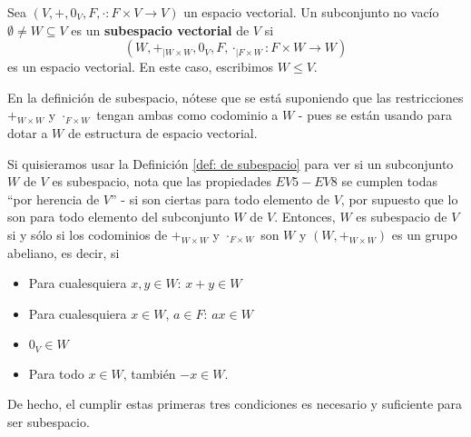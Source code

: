 \begin{defi}
		\label{def: de subespacio}
	Sea $(V, +, 0_{V}, F, \cdot : F \times V \longrightarrow V)$ un espacio vectorial.
	Un subconjunto no vacío $\emptyset \neq W \subseteq V$ es un
	\textbf{subespacio vectorial} de $V$ si 
	$$(W, +_{| W \times W}, 0_{V}, F, \cdot_{|F \times W}: F \times W \longrightarrow W)$$
	es un espacio vectorial.
	En este caso, escribimos $W \leq V$.
\end{defi}
En la definición de subespacio, nótese que se está suponiendo que
las restricciones $+_{W \times W}$ y $\cdot_{F \times W}$ 
tengan ambas como codominio a $W$ - pues se están usando para dotar a $W$ 
de estructura de espacio vectorial.

Si quisieramos usar la Definición
\ref{def: de subespacio} para ver si un subconjunto $W$ de
$V$ es subespacio, nota que las propiedades 
$EV5 - EV8$ se cumplen todas ``por herencia de $V$'' - si son ciertas
para todo elemento de $V$, por supuesto que lo son para todo elemento del
subconjunto $W$ de $V$. Entonces, $W$ es subespacio de $V$ si y sólo si  
los codominios de $+_{W \times W}$ y $\cdot_{F \times W}$ son $W$ y 
$(W, +_{W \times W})$ es un grupo abeliano, es decir, si 

\begin{itemize}
	\item Para cualesquiera $x, y \in W$: $x + y \in W$
	\item Para cualesquiera $x \in W$, $a \in F$: $ax \in W$
	\item $0_{V} \in W$
	\item Para todo $x \in W$, también $-x \in W$.
\end{itemize}
De hecho, el cumplir estas
primeras tres condiciones
es necesario y suficiente para ser subespacio.

